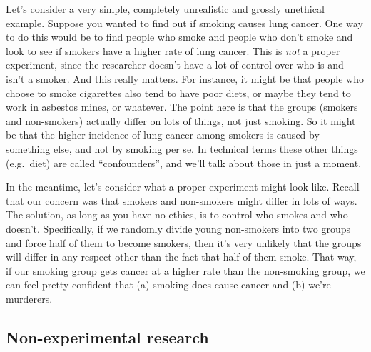 \documentclass[
  letterpaper,
]{book}
\begin{document}
Let's consider a very simple, completely unrealistic and grossly
unethical example. Suppose you wanted to find out if smoking causes lung
cancer. One way to do this would be to find people who smoke and people
who don't smoke and look to see if smokers have a higher rate of lung
cancer. This is \emph{not} a proper experiment, since the researcher
doesn't have a lot of control over who is and isn't a smoker. And this
really matters. For instance, it might be that people who choose to
smoke cigarettes also tend to have poor diets, or maybe they tend to
work in asbestos mines, or whatever. The point here is that the groups
(smokers and non-smokers) actually differ on lots of things, not just
smoking. So it might be that the higher incidence of lung cancer among
smokers is caused by something else, and not by smoking per se. In
technical terms these other things (e.g.~diet) are called
``confounders'', and we'll talk about those in just a moment.

In the meantime, let's consider what a proper experiment might look
like. Recall that our concern was that smokers and non-smokers might
differ in lots of ways. The solution, as long as you have no ethics, is
to control who smokes and who doesn't. Specifically, if we randomly
divide young non-smokers into two groups and force half of them to
become smokers, then it's very unlikely that the groups will differ in
any respect other than the fact that half of them smoke. That way, if
our smoking group gets cancer at a higher rate than the non-smoking
group, we can feel pretty confident that (a) smoking does cause cancer
and (b) we're murderers.

\hypertarget{non-experimental-research}{%
\subsection{Non-experimental research}\label{non-experimental-research}}
\end{document}

